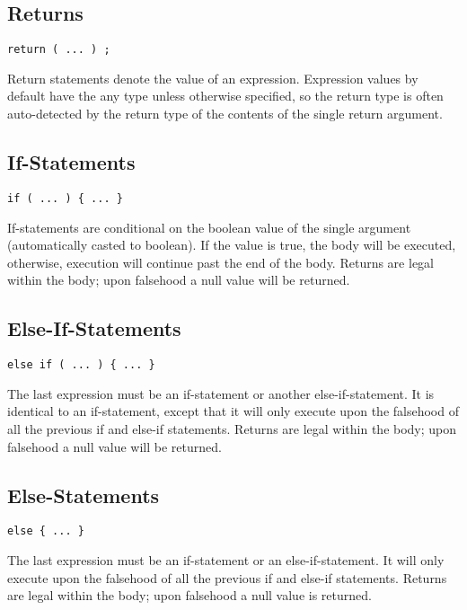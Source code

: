 \documentclass[10pt,a4paper]{article}
\begin{document}
\subsection{Returns}
\begin{verbatim}
return ( ... ) ;
\end{verbatim}

Return statements denote the value of an expression. Expression values by default have the any type unless otherwise specified, so the return type is often auto-detected by the return type of the contents of the single return argument.

\subsection{If-Statements}
\label{sec:ifStatements}
\begin{verbatim}
if ( ... ) { ... }
\end{verbatim}

If-statements are conditional on the boolean value of the single argument (automatically casted to boolean). If the value is true, the body will be executed, otherwise, execution will continue past the end of the body. Returns are legal within the body; upon falsehood a null value will be returned.

\subsection{Else-If-Statements}
\begin{verbatim}
else if ( ... ) { ... }
\end{verbatim}

The last expression must be an if-statement or another else-if-statement. It is identical to an if-statement, except that it will only execute upon the falsehood of all the previous if and else-if statements. Returns are legal within the body; upon falsehood a null value will be returned.

\subsection{Else-Statements}
\begin{verbatim}
else { ... }
\end{verbatim}

The last expression must be an if-statement or an else-if-statement. It will only execute upon the falsehood of all the previous if and else-if statements. Returns are legal within the body; upon falsehood a null value is returned.
\end{document}
